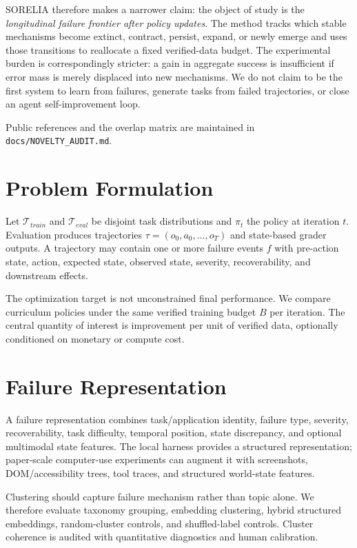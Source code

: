 \documentclass{article}
\begin{document}
SORELIA therefore makes a narrower claim: the object of study is the \emph{longitudinal failure frontier after policy updates}. The method tracks which stable mechanisms become extinct, contract, persist, expand, or newly emerge and uses those transitions to reallocate a fixed verified-data budget. The experimental burden is correspondingly stricter: a gain in aggregate success is insufficient if error mass is merely displaced into new mechanisms. We do not claim to be the first system to learn from failures, generate tasks from failed trajectories, or close an agent self-improvement loop.

Public references and the overlap matrix are maintained in \texttt{docs/NOVELTY\_AUDIT.md}.

\section{Problem Formulation}
Let $\mathcal{T}_{train}$ and $\mathcal{T}_{eval}$ be disjoint task distributions and $\pi_t$ the policy at iteration $t$. Evaluation produces trajectories $\tau=(o_0,a_0,\ldots,o_T)$ and state-based grader outputs. A trajectory may contain one or more failure events $f$ with pre-action state, action, expected state, observed state, severity, recoverability, and downstream effects.

The optimization target is not unconstrained final performance. We compare curriculum policies under the same verified training budget $B$ per iteration. The central quantity of interest is improvement per unit of verified data, optionally conditioned on monetary or compute cost.

\section{Failure Representation}
A failure representation combines task/application identity, failure type, severity, recoverability, task difficulty, temporal position, state discrepancy, and optional multimodal state features. The local harness provides a structured representation; paper-scale computer-use experiments can augment it with screenshots, DOM/accessibility trees, tool traces, and structured world-state features.

Clustering should capture failure mechanism rather than topic alone. We therefore evaluate taxonomy grouping, embedding clustering, hybrid structured embeddings, random-cluster controls, and shuffled-label controls. Cluster coherence is audited with quantitative diagnostics and human calibration.
\end{document}
